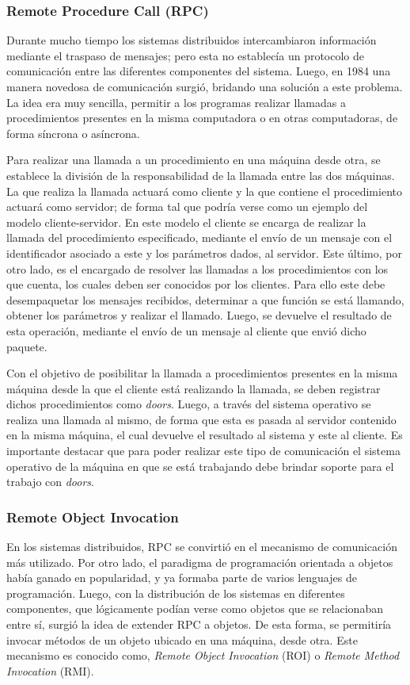 \subsubsection{Remote Procedure Call (RPC)}
Durante mucho tiempo los sistemas distribuidos intercambiaron información
mediante el traspaso de mensajes; pero esta no establecía un protocolo de
comunicación entre las diferentes componentes del sistema. Luego, en 1984 una
manera novedosa de comunicación surgió, bridando una solución a este problema.
La idea era muy sencilla, permitir a los programas realizar llamadas a
procedimientos presentes en la misma computadora o en otras computadoras, de
forma síncrona o asíncrona\cite{Tanenbaum2007}.

Para realizar una llamada a un procedimiento en una máquina desde otra, se
establece la división de la responsabilidad de la llamada entre las dos
máquinas. La que realiza la llamada actuará como cliente y la que contiene el
procedimiento actuará como servidor; de forma tal que podría verse como un
ejemplo del modelo cliente-servidor. En este modelo el cliente se encarga de
realizar la llamada del procedimiento especificado, mediante el envío de un
mensaje con el identificador asociado a este y los parámetros dados, al
servidor. Este último, por otro lado, es el encargado de resolver las llamadas a
los procedimientos con los que cuenta, los cuales deben ser conocidos por los
clientes. Para ello este debe desempaquetar los mensajes recibidos, determinar a
que función se está llamando, obtener los parámetros y realizar el llamado.
Luego, se devuelve el resultado de esta operación, mediante el envío de un
mensaje al cliente que envió dicho paquete\cite{Birrell1984}.
 
Con el objetivo de posibilitar la llamada a procedimientos presentes en la misma
máquina desde la que el cliente está realizando la llamada, se deben registrar
dichos procedimientos como \emph{doors}. Luego, a través del sistema operativo
se realiza una llamada al mismo, de forma que esta es pasada al servidor
contenido en la misma máquina, el cual devuelve el resultado al sistema y este
al cliente. Es importante destacar que para poder realizar este tipo de
comunicación el sistema operativo de la máquina en que se está trabajando debe
brindar soporte para el trabajo con \emph{doors}\cite{Mitchell1994,
Hamilton1993}.

\subsubsection{Remote Object Invocation}
En los sistemas distribuidos, RPC se convirtió en el mecanismo de comunicación
más utilizado. Por otro lado, el paradigma de programación orientada a objetos
había ganado en popularidad, y ya formaba parte de varios lenguajes de
programación. Luego, con la distribución de los sistemas en diferentes
componentes, que lógicamente podían verse como objetos que se relacionaban entre
sí, surgió la idea de extender RPC a objetos. De esta forma, se permitiría
invocar métodos de un objeto ubicado en una máquina, desde otra. Este mecanismo
es conocido como, \emph{Remote Object Invocation} (ROI) o \emph{Remote Method
Invocation} (RMI)\cite{Tanenbaum2007}.

